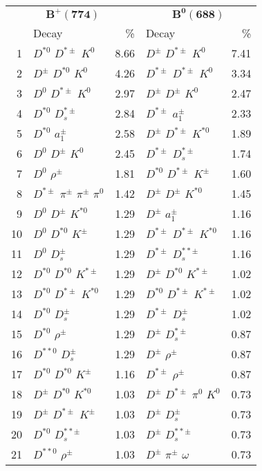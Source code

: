 \documentclass[6pt]{article}
\begin{document}
\begin{tabular}{rlr|lr}
\multicolumn{3}{c|}{$\boldsymbol{B^+(774)}$} & \multicolumn{2}{c}{$\boldsymbol{B^0(688)}$} \\
& Decay & \% & Decay & \% \\ \hline \hline
1 & $D^{*0}$ $D^{*\pm}$ $K^0$ & 8.66 & $D^{\pm}$ $D^{*\pm}$ $K^0$ & 7.41 \\
2 & $D^{\pm}$ $D^{*0}$ $K^0$ & 4.26 & $D^{*\pm}$ $D^{*\pm}$ $K^0$ & 3.34 \\
3 & $D^0$ $D^{*\pm}$ $K^0$ & 2.97 & $D^{\pm}$ $D^{\pm}$ $K^0$ & 2.47 \\
4 & $D^{*0}$ $D_s^{*\pm}$ & 2.84 & $D^{*\pm}$ $a_1^{\pm}$ & 2.33 \\
5 & $D^{*0}$ $a_1^{\pm}$ & 2.58 & $D^{\pm}$ $D^{*\pm}$ $K^{*0}$ & 1.89 \\
6 & $D^0$ $D^{\pm}$ $K^0$ & 2.45 & $D^{*\pm}$ $D_s^{*\pm}$ & 1.74 \\
7 & $D^0$ $\rho^{\pm}$ & 1.81 & $D^{*0}$ $D^{*\pm}$ $K^{\pm}$ & 1.60 \\
8 & $D^{*\pm}$ $\pi^{\pm}$ $\pi^{\pm}$ $\pi^0$ & 1.42 & $D^{\pm}$ $D^{\pm}$ $K^{*0}$ & 1.45 \\
9 & $D^0$ $D^{\pm}$ $K^{*0}$ & 1.29 & $D^{\pm}$ $a_1^{\pm}$ & 1.16 \\
10 & $D^0$ $D^{*0}$ $K^{\pm}$ & 1.29 & $D^{*\pm}$ $D^{*\pm}$ $K^{*0}$ & 1.16 \\
11 & $D^0$ $D_s^{\pm}$ & 1.29 & $D^{*\pm}$ $D_s^{**\pm}$ & 1.16 \\
12 & $D^{*0}$ $D^{*0}$ $K^{*\pm}$ & 1.29 & $D^{\pm}$ $D^{*0}$ $K^{*\pm}$ & 1.02 \\
13 & $D^{*0}$ $D^{*\pm}$ $K^{*0}$ & 1.29 & $D^{*0}$ $D^{*\pm}$ $K^{*\pm}$ & 1.02 \\
14 & $D^{*0}$ $D_s^{\pm}$ & 1.29 & $D^{*\pm}$ $D_s^{\pm}$ & 1.02 \\
15 & $D^{*0}$ $\rho^{\pm}$ & 1.29 & $D^{\pm}$ $D_s^{*\pm}$ & 0.87 \\
16 & $D^{**0}$ $D_s^{\pm}$ & 1.29 & $D^{\pm}$ $\rho^{\pm}$ & 0.87 \\
17 & $D^{*0}$ $D^{*0}$ $K^{\pm}$ & 1.16 & $D^{*\pm}$ $\rho^{\pm}$ & 0.87 \\
18 & $D^{\pm}$ $D^{*0}$ $K^{*0}$ & 1.03 & $D^{\pm}$ $D^{*\pm}$ $\pi^0$ $K^0$ & 0.73 \\
19 & $D^{\pm}$ $D^{*\pm}$ $K^{\pm}$ & 1.03 & $D^{\pm}$ $D_s^{\pm}$ & 0.73 \\
20 & $D^{*0}$ $D_s^{**\pm}$ & 1.03 & $D^{\pm}$ $D_s^{**\pm}$ & 0.73 \\
21 & $D^{**0}$ $\rho^{\pm}$ & 1.03 & $D^{\pm}$ $\pi^{\pm}$ $\omega$ & 0.73 \\

\end{tabular}
\end{document}
